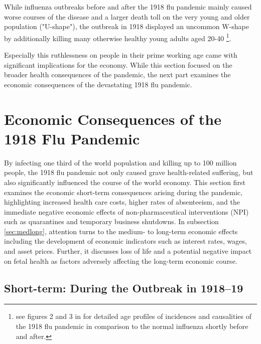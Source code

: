 \documentclass[12pt,a4paper]{article}
\begin{document}
While influenza outbreaks before and after the 1918 flu pandemic mainly caused worse courses of the disease and a larger death toll on the very young and older population ("U-shape"),
the outbreak in 1918 displayed an uncommon W-shape by additionally killing many otherwise healthy young adults aged 20-40 \citep{taubenberger1918InfluenzaMother2006}\footnote{
	see figures 2 and 3 in \cite{taubenberger1918InfluenzaMother2006} for detailed age profiles of incidences and causalities of the 1918 flu pandemic in comparison to the normal influenza shortly before and after.}.

Especially this ruthlessness on people in their prime working age came with significant implications for the economy.
While this section focused on the broader health consequences of the pandemic, the next part examines the economic consequences of the devastating 1918 flu pandemic.

\section{Economic Consequences of the 1918 Flu Pandemic}

By infecting one third of the world population and killing up to 100 million people, the 1918 flu pandemic not only caused grave health-related suffering, but also significantly influenced the course of the world economy.
This section first examines the economic short-term consequences arising during the pandemic, highlighting increased health care costs, higher rates of absenteeism, and the immediate negative economic effects of non-pharmaceutical interventions (NPI) such as quarantines and temporary business shutdowns.
In subsection \ref{sec:medlong}, attention turns to the medium- to long-term economic effects including the development of economic indicators such as interest rates, wages, and asset prices. 
Further, it discusses loss of life and a potential negative impact on fetal health as factors adversely affecting the long-term economic course.


\subsection{Short-term: During the Outbreak in 1918--19}
\end{document}
